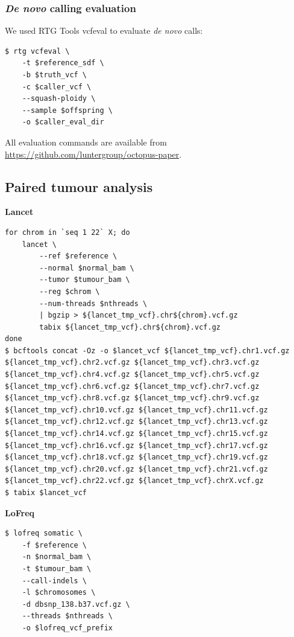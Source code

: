 \documentclass{article}
\begin{document}
\subsubsection*{\textit{De novo} calling evaluation}

\noindent We used RTG Tools vcfeval to evaluate \textit{de novo} calls:

\begin{lstlisting}
$ rtg vcfeval \
    -t $reference_sdf \
    -b $truth_vcf \
    -c $caller_vcf \
    --squash-ploidy \
    --sample $offspring \
    -o $caller_eval_dir
\end{lstlisting}

\noindent All evaluation commands are available from \url{https://github.com/luntergroup/octopus-paper}.

\subsection*{Paired tumour analysis}

\noindent \textbf{Lancet}

\begin{lstlisting}
for chrom in `seq 1 22` X; do
    lancet \
        --ref $reference \
        --normal $normal_bam \
        --tumor $tumour_bam \
        --reg $chrom \
        --num-threads $nthreads \
        | bgzip > ${lancet_tmp_vcf}.chr${chrom}.vcf.gz
        tabix ${lancet_tmp_vcf}.chr${chrom}.vcf.gz
done
$ bcftools concat -Oz -o $lancet_vcf ${lancet_tmp_vcf}.chr1.vcf.gz ${lancet_tmp_vcf}.chr2.vcf.gz ${lancet_tmp_vcf}.chr3.vcf.gz ${lancet_tmp_vcf}.chr4.vcf.gz ${lancet_tmp_vcf}.chr5.vcf.gz ${lancet_tmp_vcf}.chr6.vcf.gz ${lancet_tmp_vcf}.chr7.vcf.gz ${lancet_tmp_vcf}.chr8.vcf.gz ${lancet_tmp_vcf}.chr9.vcf.gz ${lancet_tmp_vcf}.chr10.vcf.gz ${lancet_tmp_vcf}.chr11.vcf.gz ${lancet_tmp_vcf}.chr12.vcf.gz ${lancet_tmp_vcf}.chr13.vcf.gz ${lancet_tmp_vcf}.chr14.vcf.gz ${lancet_tmp_vcf}.chr15.vcf.gz ${lancet_tmp_vcf}.chr16.vcf.gz ${lancet_tmp_vcf}.chr17.vcf.gz ${lancet_tmp_vcf}.chr18.vcf.gz ${lancet_tmp_vcf}.chr19.vcf.gz ${lancet_tmp_vcf}.chr20.vcf.gz ${lancet_tmp_vcf}.chr21.vcf.gz ${lancet_tmp_vcf}.chr22.vcf.gz ${lancet_tmp_vcf}.chrX.vcf.gz
$ tabix $lancet_vcf
\end{lstlisting}

\noindent \textbf{LoFreq}

\begin{lstlisting}
$ lofreq somatic \
    -f $reference \
    -n $normal_bam \
    -t $tumour_bam \
    --call-indels \
    -l $chromosomes \
    -d dbsnp_138.b37.vcf.gz \
    --threads $nthreads \
    -o $lofreq_vcf_prefix
\end{lstlisting}
\end{document}
